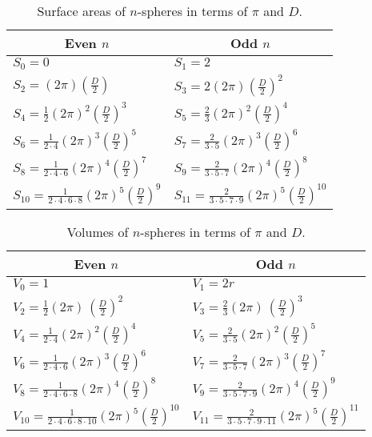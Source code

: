 \begin{table}
\begin{center}
\begin{tabular}{l|l}
\multicolumn{1}{c}{Even $n$} & \multicolumn{1}{c}{Odd $n$} \\ \hline
$S_0 = 0$ & $S_1 = 2$ \smallskip \\ 
$S_2 = (2\pi)\left(\frac{D}{2}\right)$ & $S_3 = 2(2\pi)\left(\frac{D}{2}\right)^2$ \smallskip \\ 
$S_4 = \frac{1}{2}(2\pi)^2 \left(\frac{D}{2}\right)^3$ & $S_5 = \frac{2}{3} (2\pi)^2 \left(\frac{D}{2}\right)^4$ \smallskip \\ 
$S_6 = \frac{1}{2\cdot 4}(2\pi)^3 \left(\frac{D}{2}\right)^5$ & $S_7 = \frac{2}{3\cdot 5} (2\pi)^3 \left(\frac{D}{2}\right)^6$ \smallskip \\ 
$S_8 = \frac{1}{2\cdot 4\cdot 6}(2\pi)^4 \left(\frac{D}{2}\right)^7$ & $S_9 = \frac{2}{3\cdot 5\cdot 7} (2\pi)^4 \left(\frac{D}{2}\right)^8$ \smallskip \\ 
$S_{10} = \frac{1}{2\cdot 4\cdot 6\cdot 8}(2\pi)^5 \left(\frac{D}{2}\right)^9$ & $S_{11} = \frac{2}{3\cdot 5\cdot 7\cdot 9} (2\pi)^5 \left(\frac{D}{2}\right)^{10}$ 
\end{tabular}
\end{center}
\caption{Surface areas of $n$-spheres in terms of $\pi$ and $D$.\label{table:alternate_circle_constant}}
\end{table}

\begin{table}
\begin{center}
\begin{tabular}{l|l}
\multicolumn{1}{c}{Even $n$} & \multicolumn{1}{c}{Odd $n$} \\ \hline
 $V_0 = 1$ & $V_1 = 2r$ \smallskip \\ 
 $V_2 = \frac{1}{2}(2\pi)\,\left(\frac{D}{2}\right)^2$ & $V_3 = \frac{2}{3} (2\pi)\,\left(\frac{D}{2}\right)^3$ \smallskip \\ 
 $V_4 = \frac{1}{2\cdot 4}(2\pi)^2 \left(\frac{D}{2}\right)^4$ & $V_5 =\frac{2}{3\cdot 5} (2\pi)^2 \left(\frac{D}{2}\right)^5$ \smallskip \\ 
 $V_6 =\frac{1}{2\cdot 4\cdot 6}(2\pi)^3 \left(\frac{D}{2}\right)^6$ & $V_7 = \frac{2}{3\cdot 5\cdot 7} (2\pi)^3 \left(\frac{D}{2}\right)^7$ \smallskip \\ 
 $V_8 = \frac{1}{2\cdot 4\cdot 6\cdot 8}(2\pi)^4 \left(\frac{D}{2}\right)^8$ & $V_9 = \frac{2}{3\cdot 5\cdot 7\cdot 9} (2\pi)^4 \left(\frac{D}{2}\right)^9$ \smallskip \\ 
 $V_{10} = \frac{1}{2\cdot 4\cdot 6\cdot 8\cdot 10}(2\pi)^5 \left(\frac{D}{2}\right)^{10}$ & $V_{11} = \frac{2}{3\cdot 5\cdot 7\cdot 9\cdot 11} (2\pi)^5 \left(\frac{D}{2}\right)^{11}$ 
\end{tabular}
\end{center}
\caption{Volumes of $n$-spheres in terms of $\pi$ and $D$.\label{table:alternate_circle_constant}}
\end{table}
